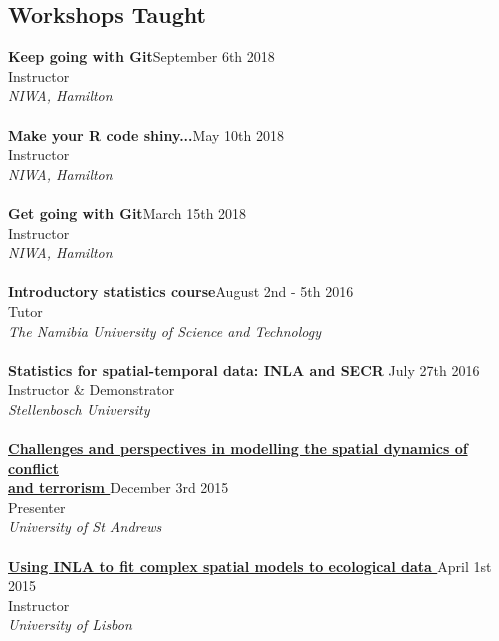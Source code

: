 \documentclass[10pt,letter]{res}
\begin{document}
\begin{resume}
\section{Workshops Taught}
\vspace{1mm}
{\textbf{Keep going with Git}}\hfill September 6th 2018\\
Instructor \\
 {\sl NIWA, Hamilton}\\
 \hdashrule[0.5ex]{4cm}{1pt}{1pt}\\
{\textbf{Make your R code shiny...}}\hfill May 10th 2018\\
Instructor \\
 {\sl NIWA, Hamilton}\\
 \hdashrule[0.5ex]{4cm}{1pt}{1pt}\\
{\textbf{Get going with Git}}\hfill March 15th 2018\\
Instructor \\
 {\sl NIWA, Hamilton}\\
 \hdashrule[0.5ex]{4cm}{1pt}{1pt}\\
{\textbf{Introductory statistics course}}\hfill August 2nd - 5th 2016\\
Tutor \\
 {\sl The Namibia University of Science and Technology }\\
 \hdashrule[0.5ex]{4cm}{1pt}{1pt}\\
 {\textbf{{Statistics for spatial-temporal data: INLA and SECR }}} \hfill July 27th 2016\\
 Instructor \& Demonstrator\\
 {\sl Stellenbosch University }\\
 \hdashrule[0.5ex]{4cm}{1pt}{1pt}\\
 {\textbf{\href{http://modelling.wp.st-andrews.ac.uk/}{Challenges and perspectives in modelling the spatial dynamics of conflict\\ and terrorism }}} \hfill December 3rd 2015\\
 Presenter\\
 {\sl University of St Andrews}\\
 \hdashrule[0.5ex]{4cm}{1pt}{1pt}\\
{\textbf{\href{http://www.startfactor.pt/training1.html}{Using INLA to fit complex spatial models to ecological data }}} \hfill April 1st 2015\\
 Instructor\\
 {\sl University of Lisbon}\\
 \hdashrule[0.5ex]{4cm}{1pt}{1pt}\\

\end{resume}
\end{document}
